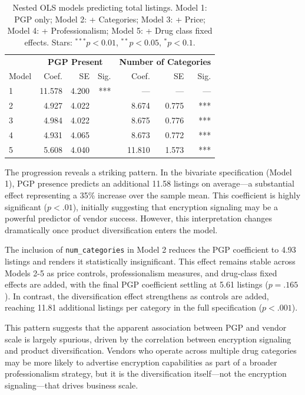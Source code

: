 \documentclass{article}
\begin{document}
\begin{table}[htbp]
  \centering
  \scriptsize
  \setlength\tabcolsep{4pt}
  \begin{tabular}{lrrrrrr}
    \toprule
    & \multicolumn{3}{c}{\textbf{PGP Present}} & \multicolumn{3}{c}{\textbf{Number of Categories}} \\
    \cmidrule(lr){2-4} \cmidrule(lr){5-7}
    Model & Coef. & SE & Sig. & Coef. & SE & Sig. \\
    \midrule
    1 & 11.578 & 4.200 & *** & — & — & — \\
    2 &  4.927 & 4.022 &  & 8.674 & 0.775 & *** \\
    3 &  4.984 & 4.022 &  & 8.675 & 0.776 & *** \\
    4 &  4.931 & 4.065 &  & 8.673 & 0.772 & *** \\
    5 &  5.608 & 4.040 &  & 11.810 & 1.573 & *** \\
    \bottomrule
  \end{tabular}
  \caption{Nested OLS models predicting total listings. Model 1: PGP only; Model 2: + Categories; Model 3: + Price; Model 4: + Professionalism; Model 5: + Drug class fixed effects. Stars: $^{***}p<0.01$, $^{**}p<0.05$, $^{*}p<0.1$.}
  \label{tab:ols_size_nested}
\end{table}

The progression reveals a striking pattern. In the bivariate specification (Model 1), PGP presence predicts an additional 11.58 listings on average—a substantial effect representing a 35\% increase over the sample mean. This coefficient is highly significant ($p < .01$), initially suggesting that encryption signaling may be a powerful predictor of vendor success. However, this interpretation changes dramatically once product diversification enters the model.

The inclusion of \texttt{num\_categories} in Model 2 reduces the PGP coefficient to 4.93 listings and renders it statistically insignificant. This effect remains stable across Models 2-5 as price controls, professionalism measures, and drug-class fixed effects are added, with the final PGP coefficient settling at 5.61 listings ($p = .165$). In contrast, the diversification effect strengthens as controls are added, reaching 11.81 additional listings per category in the full specification ($p < .001$).

This pattern suggests that the apparent association between PGP and vendor scale is largely spurious, driven by the correlation between encryption signaling and product diversification. Vendors who operate across multiple drug categories may be more likely to advertise encryption capabilities as part of a broader professionalism strategy, but it is the diversification itself—not the encryption signaling—that drives business scale.
\end{document}
